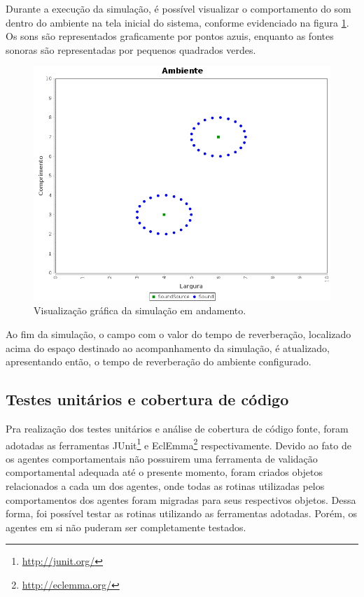 Durante a execução da simulação, é possível visualizar o comportamento do som dentro do ambiente na tela inicial do sistema, conforme evidenciado na figura \ref{simulation}. Os sons são representados graficamente por pontos azuis, enquanto as fontes sonoras são representadas por pequenos quadrados verdes.

\begin{figure}[!htb]
\centering
\includegraphics[scale=0.4]{figuras/telas/simulation3}
\caption{Visualização gráfica da simulação em andamento.}
\label{simulation}
\end{figure}

Ao fim da simulação, o campo com o valor do tempo de reverberação, localizado acima do espaço destinado ao acompanhamento da simulação, é atualizado, apresentando então, o tempo de reverberação do ambiente configurado.

\subsection{Testes unitários e cobertura de código}

Pra realização dos testes unitários e análise de cobertura de código fonte, foram adotadas as ferramentas JUnit\footnote{\url{http://junit.org/}} e EclEmma\footnote{\url{http://eclemma.org/}} respectivamente. Devido ao fato de os agentes comportamentais não possuirem uma ferramenta de validação comportamental adequada até o presente momento, foram criados objetos relacionados a cada um dos agentes, onde todas as rotinas utilizadas pelos comportamentos dos agentes foram migradas para seus respectivos objetos. Dessa forma, foi possível testar as rotinas utilizando as ferramentas adotadas. Porém, os agentes em si não puderam ser completamente testados.

